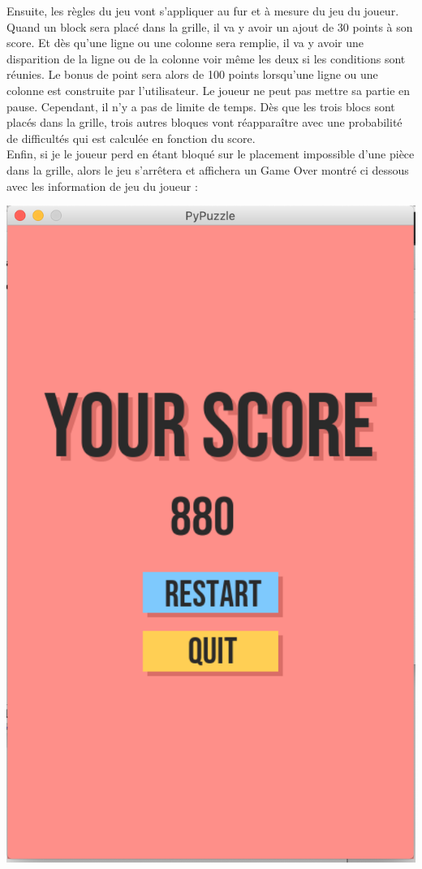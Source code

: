 \documentclass[]{report}
\begin{document}
Ensuite, les règles du jeu vont s'appliquer au fur et à mesure du jeu du joueur. Quand un block sera placé dans la grille, il va y avoir un ajout de 30 points à son score. Et dès qu'une ligne ou une colonne sera remplie, il va y avoir une disparition de la ligne ou de la colonne voir même les deux si les conditions sont réunies. Le bonus de point sera alors de 100 points lorsqu'une ligne ou une colonne est construite par l'utilisateur. Le joueur ne peut pas mettre sa partie en pause. Cependant, il n'y a pas de limite de temps. Dès que les trois blocs sont placés dans la grille, trois autres bloques vont réapparaître avec une probabilité de difficultés qui est calculée en fonction du score. \\

Enfin, si je le joueur perd en étant bloqué sur le placement impossible d'une pièce dans la grille, alors le jeu s'arrêtera et affichera un Game Over montré ci dessous avec les information de jeu du joueur : \\
\begin{center}
\includegraphics[scale=0.2]{images/gameover.png}\\
\end{center}
\end{document}
